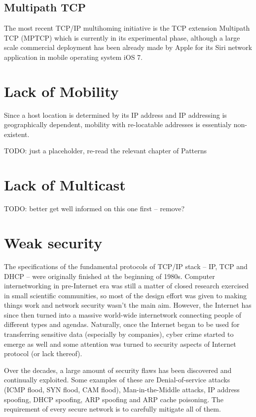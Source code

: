         \subsection{Multipath TCP}
        The most recent TCP/IP multihoming initiative is the TCP extension Multipath TCP (MPTCP) which is currently in its experimental phase, although a large scale commercial deployment has been already made by Apple for its Siri network application in mobile operating system iOS 7.

    \section{Lack of Mobility}

        Since a host location is determined by its IP address and IP addressing is geographically dependent, mobility with re-locatable addresses is essentialy non-existent.

        TODO: just a placeholder, re-read the relevant chapter of Patterns

    \section{Lack of Multicast}

        TODO: better get well informed on this one first -- remove?

    \section{Weak security}
        The specifications of the fundamental protocols of TCP/IP stack -- IP, TCP and DHCP -- were originally finished at the beginning of 1980s. Computer internetworking in pre-Internet era was still a matter of closed research exercised in small scientific communities, so most of the design effort was given to making things work and network security wasn't the main aim. However, the Internet has since then turned into a massive world-wide internetwork connecting people of different types and agendas. Naturally, once the Internet began to be used for transferring sensitive data (especially by companies), cyber crime started to emerge as well and some attention was turned to security aspects of Internet protocol (or lack thereof).

        Over the decades, a large amount of security flaws has been discovered and continually exploited. Some examples of these are Denial-of-service attacks (ICMP flood, SYN flood, CAM flood), Man-in-the-Middle attacks, IP address spoofing, DHCP spoofing, ARP spoofing and ARP cache poisoning. The requirement of every secure network is to carefully mitigate all of them.

